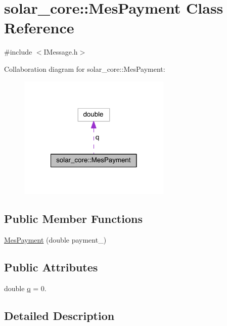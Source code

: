 \hypertarget{classsolar__core_1_1_mes_payment}{}\section{solar\+\_\+core\+:\+:Mes\+Payment Class Reference}
\label{classsolar__core_1_1_mes_payment}


{\ttfamily \#include $<$I\+Message.\+h$>$}



Collaboration diagram for solar\+\_\+core\+:\+:Mes\+Payment\+:
\nopagebreak
\begin{figure}[H]
\begin{center}
\leavevmode
\includegraphics[width=206pt]{classsolar__core_1_1_mes_payment__coll__graph}
\end{center}
\end{figure}
\subsection*{Public Member Functions}
\begin{DoxyCompactItemize}
\item 
\hyperlink{classsolar__core_1_1_mes_payment_a1f1892acd5c8da372d061a69445d68bd}{Mes\+Payment} (double payment\+\_\+)
\end{DoxyCompactItemize}
\subsection*{Public Attributes}
\begin{DoxyCompactItemize}
\item 
double \hyperlink{classsolar__core_1_1_mes_payment_a5d137def5ff6f3659650c08f90d07ca2}{q} = 0.
\end{DoxyCompactItemize}


\subsection{Detailed Description}


